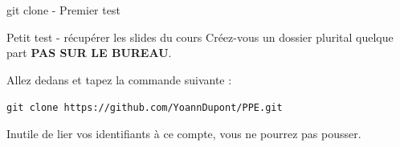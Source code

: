 \documentclass[svgnames,smaller]{beamer}
\begin{document}
\begin{frame}{git clone - Premier test}
\begin{exampleblock}{Petit test - récupérer les slides du cours}
Créez-vous un dossier plurital quelque part \textbf{PAS SUR LE BUREAU}.

Allez dedans et tapez la commande suivante :

\texttt{git clone https://github.com/YoannDupont/PPE.git}

Inutile de lier vos identifiants à ce compte, vous ne pourrez pas pousser.
\end{exampleblock}
\end{frame}

\end{document}
